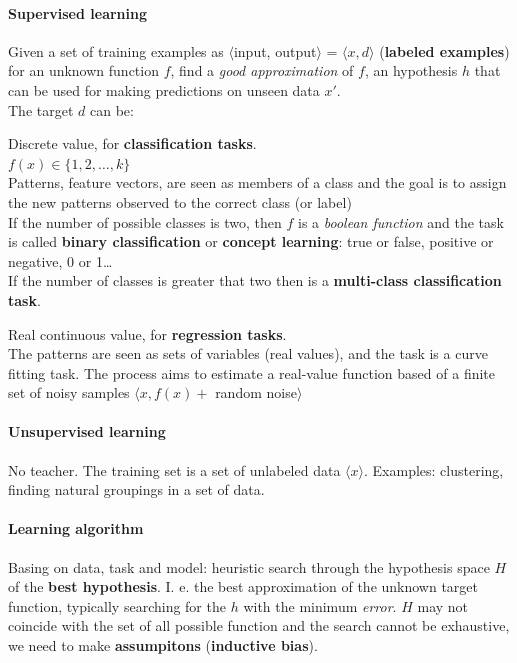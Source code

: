 \documentclass[10pt]{report}
\begin{document}
\paragraph{Supervised learning} Given a set of training examples as $\langle$input, output$\rangle$ = $\langle x,d\rangle$ (\textbf{labeled examples}) for an unknown function $f$, find a \textit{good approximation} of $f$, an hypothesis $h$ that can be used for making predictions on unseen data $x'$.\\
The target $d$ can be:
\begin{list}{}{}
	\item Discrete value, for \textbf{classification tasks}.\\
	$f(x) \in \{1,2,\ldots,k\}$\\
	Patterns, feature vectors, are seen as members of a class and the goal is to assign the new patterns observed to the correct class (or label)\\
	If the number of possible classes is two, then $f$ is a \textit{boolean function} and the task is called \textbf{binary classification} or \textbf{concept learning}: true or false, positive or negative, 0 or 1\ldots\\
	If the number of classes is greater that two then is a \textbf{multi-class classification task}.
	\item Real continuous value, for \textbf{regression tasks}.\\
	The patterns are seen as sets of variables (real values), and the task is a curve fitting task. The process aims to estimate a real-value function based of a finite set of noisy samples $\langle x, f(x) +$ random noise$\rangle$
\end{list}
\paragraph{Unsupervised learning} No teacher. The training set is a set of unlabeled data $\langle x\rangle$. Examples: clustering, finding natural groupings in a set of data.
\paragraph{Learning algorithm} Basing on data, task and model: heuristic search through the hypothesis space $H$ of the \textbf{best hypothesis}. I. e. the best approximation of the unknown target function, typically searching for the $h$ with the minimum \textit{error}. $H$ may not coincide with the set of all possible function and the search cannot be exhaustive, we need to make \textbf{assumpitons} (\textbf{inductive bias}).
\end{document}
